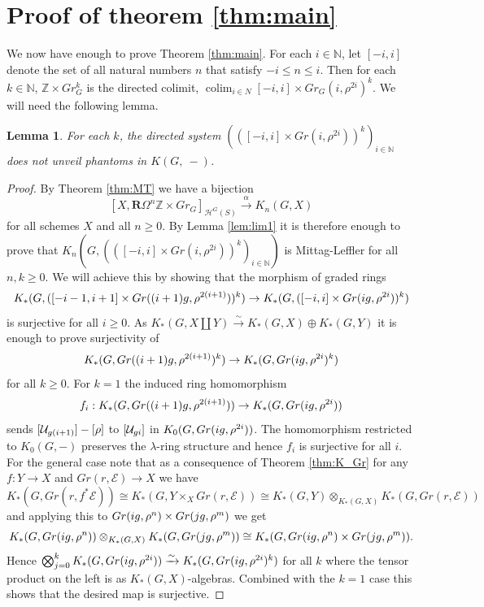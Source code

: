 \documentclass[11pt,twoside]{amsart}
\newtheorem{lemma}[theorem]{Lemma}
\theoremstyle{definition}
\theoremstyle{remark}
\numberwithin{equation}{section}
\newcommand{\mc}{\mathcal}
\newcommand{\ZZ}{\mathbb{Z}}
\newcommand{\iso}{\xrightarrow{\sim}}
\DeclareMathOperator*{\colim}{colim}
\begin{document}
		\section{Proof of theorem \ref{thm:main}}
	We now have enough to prove Theorem \ref{thm:main}. For each $i\in \mathbb{N}$, let $[-i,i]$ denote the set of all natural numbers $n$ that satisfy $-i\leq n \leq i$. Then for each $k\in \mathbb{N}$, $\ZZ\times Gr_G^k$ is the directed colimit, $\colim_{i\in N} [-i,i]\times Gr_G(i,\rho^{2i})^k$. We will need the following lemma.
	\begin{lemma}\label{lem:K_Mittag-Leffler}
		For each $k$, the directed system $(([-i,i]\times Gr(i,\rho^{2i}))^k)_{i\in \mathbb{N}}$ does not unveil phantoms in $K(G,\ -)$.
		\end{lemma}
	\begin{proof}
		By Theorem \ref{thm:MT} we have a bijection 
		\[ [X,\mathbf{R}\Omega^n\ZZ\times Gr_G]_{\mc{H}^G(S)}\xrightarrow{\alpha} K_n(G, X)\]
		for all schemes $X$ and all $n\geq 0$. By Lemma \ref{lem:lim1} it is therefore enough to prove that $K_n(G,(([-i,i]\times Gr(i,\rho^{2i}))^k)_{i\in \mathbb{N}})$ is Mittag-Leffler for all $n,k\geq 0$. We will achieve this by showing that the morphism of graded rings 
		\[K_*(G,([-i-1,i+1]\times Gr((i+1)\textsl{g},\rho^{2(i+1)}))^k)\to K_*(G,([-i,i]\times Gr(i\textsl{g},\rho^{2i}))^k) \]
		is surjective for all $i\geq 0$. As $K_*(G,X\coprod Y)\iso K_*(G,X)\oplus K_*(G,Y)$  it is enough to prove surjectivity of 
        \[K_*(G, Gr((i+1)\textsl{g},\rho^{2(i+1)})^k)\to K_*(G, Gr(i\textsl{g},\rho^{2i})^k) \]
        for all $k\geq 0$.
        For $k=1$ the induced ring homomorphism 
		\[f_i:K_*(G,Gr((i+1)\textsl{g},\rho^{2(i+1)}))\to K_*(G,Gr(i\textsl{g},\rho^{2i})) \] 
		sends $[\mathcal{U}_{\textsl{g}(i+1)}]-[\rho]$ to $[\mathcal{U}_{\textsl{g}i}]$ in $K_0(G,Gr(i\textsl{g},\rho^{2i}))$. The homomorphism restricted to $K_0(G,-)$ preserves the $\lambda$-ring structure and hence $f_i$ is surjective for all $i$. For the general case note that as a consequence of Theorem \ref{thm:K_Gr} for any $f:Y\to X$ and $Gr(r,\mc{E})\to X$ we have
        \[ K_*(G,Gr(r,f^*\mc{E}))\cong K_*(G,Y\times_X Gr(r,\mc{E}))\cong K_*(G,Y)\otimes_{K_*(G, X)} K_*(G, Gr(r,\mc{E})) \]
        and applying this to
        $Gr(i\textsl{g},\rho^{n})\times Gr(j\textsl{g},\rho^{m})$ we get \[K_*(G,Gr(i\textsl{g},\rho^{n}))\otimes_{K_*(G,X)} K_*(G,Gr(j\textsl{g},\rho^{m}))\cong K_*(G,Gr(i\textsl{g},\rho^{n})\times Gr(j\textsl{g},\rho^{m})).\]
		Hence $\bigotimes^k_{j=0} K_*(G,Gr(i\textsl{g},\rho^{2i}))\iso K_*(G,Gr(i\textsl{g},\rho^{2i})^k)$ for all $k$ where the tensor product on the left is as $K_*(G,X)$-algebras. Combined with the $k=1$ case this shows that the desired map is surjective.
		\end{proof}
\end{document}
